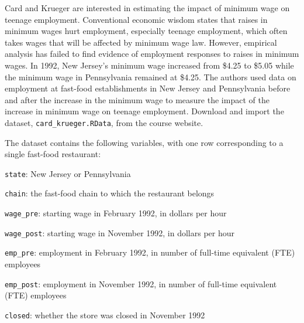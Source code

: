 \documentclass[
  12pt,
  letterpaper,
  DIV=11,
  numbers=noendperiod]{scrartcl}
\newcommand{\1}[1]{\mathds{1}\left[#1\right]}
\begin{document}
Card and Krueger are interested in estimating the impact of minimum wage
on teenage employment. Conventional economic wisdom states that raises
in minimum wages hurt employment, especially teenage employment, which
often takes wages that will be affected by minimum wage law. However,
empirical analysis has failed to find evidence of employment responses
to raises in minimum wages. In 1992, New Jersey's minimum wage increased
from \$4.25 to \$5.05 while the minimum wage in Pennsylvania remained at
\$4.25. The authors used data on employment at fast-food establishments
in New Jersey and Pennsylvania before and after the increase in the
minimum wage to measure the impact of the increase in minimum wage on
teenage employment. Download and import the dataset,
\texttt{card\_krueger.RData}, from the course website.

The dataset contains the following variables, with one row corresponding
to a single fast-food restaurant:

\item

\texttt{state}: New Jersey or Pennsylvania

\item

\texttt{chain}: the fast-food chain to which the restaurant belongs

\item

\texttt{wage\_pre}: starting wage in February 1992, in dollars per hour

\item

\texttt{wage\_post}: starting wage in November 1992, in dollars per hour

\item

\texttt{emp\_pre}: employment in February 1992, in number of full-time
equivalent (FTE) employees

\item

\texttt{emp\_post}: employment in November 1992, in number of full-time
equivalent (FTE) employees

\item

\texttt{closed}: whether the store was closed in November 1992
\end{document}
